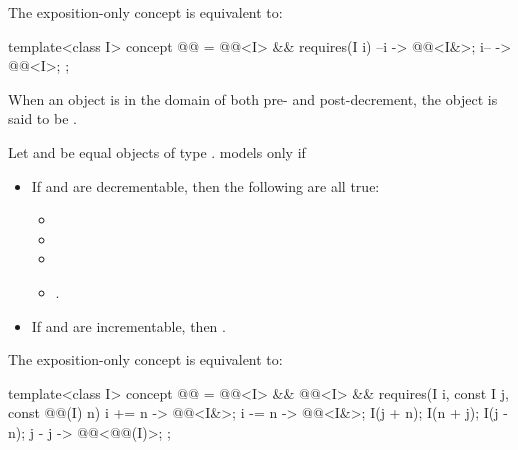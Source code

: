 \pnum
The exposition-only  concept is equivalent to:
\begin{itemdecl}
template<class I>
  concept @@ =
    @@<I> && requires(I i) {
      { --i } -> @@<I&>;
      { i-- } -> @@<I>;
    };
\end{itemdecl}

\begin{itemdescr}
\pnum
When an object is in the domain of both pre- and post-decrement,
the object is said to be .

\pnum
Let  and  be equal objects of type .
 models  only if
\begin{itemize}
\item If  and  are decrementable,
  then the following are all true:
  \begin{itemize}
  \item {}
  \item {}
  \item {}
  \item {}.
  \end{itemize}
\item If  and  are incrementable,
  then .
\end{itemize}
\end{itemdescr}

\pnum
The exposition-only  concept is equivalent to:
\begin{itemdecl}
template<class I>
  concept @@ =
    @@<I> && @@<I> &&
    requires(I i, const I j, const @@(I) n) {
      { i += n } -> @@<I&>;
      { i -= n } -> @@<I&>;
      I(j + n);
      I(n + j);
      I(j - n);
      { j - j } -> @@<@@(I)>;
    };
\end{itemdecl}

